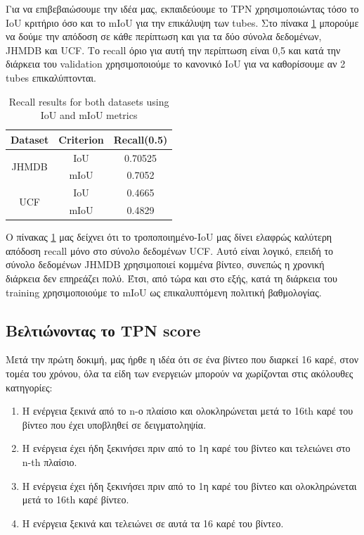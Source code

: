 \documentclass{report}
\begin{document}
Για να επιβεβαιώσουμε την ιδέα μας, εκπαιδεύουμε το TPN χρησιμοποιώντας τόσο το IoU κριτήριο όσο και το mIoU  για την επικάλυψη των tubes. Στο πίνακα \ref{table:iou_miou}
μπορούμε να δούμε την απόδοση σε κάθε περίπτωση και για τα δύο σύνολα δεδομένων, JHMDB και UCF. Το recall όριο για αυτή την περίπτωση είναι 0,5 και κατά την διάρκεια του
validation χρησιμοποιούμε το κανονικό IoU για να καθορίσουμε αν 2 tubes επικαλύπτονται.
\begin{table}[h]
\centering
  \begin{tabular}{|| c | c || c ||}
    \hline
    \textbf{Dataset} & \textbf{Criterion} & \textbf{Recall(0.5)} \\
    \hline  \hline
    \multirow{2}{4em}{JHMDB} & IoU & 0.70525 \\
    \cline{2-3}
    {} & mIoU & 0.7052 \\
    \hline
    \multirow{2}{4em}{UCF} & IoU & 0.4665 \\
    \cline{2-3}
    {} & mIoU & 0.4829 \\
    \hline      
  \end{tabular}
  \caption{Recall results for both datasets using IoU and mIoU metrics}
  \label{table:iou_miou}
\end{table}

Ο πίνακας  \ref{table:iou_miou} μας δείχνει ότι το τροποποιημένο-IoU μας δίνει ελαφρώς καλύτερη απόδοση recall μόνο στο σύνολο δεδομένων UCF. Αυτό είναι λογικό, επειδή το σύνολο δεδομένων JHMDB
χρησιμοποιεί κομμένα βίντεο, συνεπώς  η χρονική διάρκεια δεν επηρεάζει πολύ. Έτσι, από τώρα και στο εξής, κατά τη διάρκεια του training χρησιμοποιούμε το mIoU ως επικαλυπτόμενη πολιτική βαθμολογίας.

\subsection{Βελτιώνοντας το  TPN score}
Μετά την πρώτη δοκιμή, μας ήρθε η  ιδέα ότι σε ένα βίντεο που διαρκεί 16 καρέ, στον τομέα του χρόνου, όλα τα είδη των ενεργειών μπορούν να χωρίζονται στις ακόλουθες κατηγορίες:
\begin{enumerate}
\item Η ενέργεια ξεκινά από το n-ο πλαίσιο και ολοκληρώνεται μετά το 16th καρέ του βίντεο που έχει υποβληθεί σε δειγματοληψία.
\item Η ενέργεια έχει ήδη ξεκινήσει πριν από το 1η καρέ του βίντεο και τελειώνει στο n-th πλαίσιο.
\item Η ενέργεια έχει ήδη ξεκινήσει πριν από το 1η καρέ του βίντεο και ολοκληρώνεται μετά το 16th καρέ βίντεο.
\item Η ενέργεια ξεκινά και τελειώνει σε αυτά τα 16 καρέ του βίντεο.
\end{enumerate}
\end{document}
